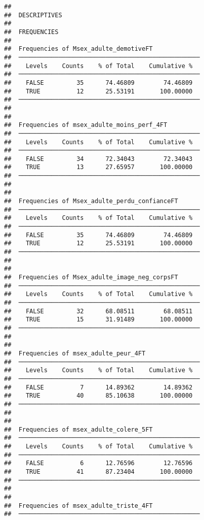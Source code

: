 \documentclass[
]{article}
\begin{document}
\begin{verbatim}
## 
##  DESCRIPTIVES
## 
##  FREQUENCIES
## 
##  Frequencies of Msex_adulte_demotiveFT              
##  ────────────────────────────────────────────────── 
##    Levels    Counts    % of Total    Cumulative %   
##  ────────────────────────────────────────────────── 
##    FALSE         35      74.46809        74.46809   
##    TRUE          12      25.53191       100.00000   
##  ────────────────────────────────────────────────── 
## 
## 
##  Frequencies of msex_adulte_moins_perf_4FT          
##  ────────────────────────────────────────────────── 
##    Levels    Counts    % of Total    Cumulative %   
##  ────────────────────────────────────────────────── 
##    FALSE         34      72.34043        72.34043   
##    TRUE          13      27.65957       100.00000   
##  ────────────────────────────────────────────────── 
## 
## 
##  Frequencies of Msex_adulte_perdu_confianceFT       
##  ────────────────────────────────────────────────── 
##    Levels    Counts    % of Total    Cumulative %   
##  ────────────────────────────────────────────────── 
##    FALSE         35      74.46809        74.46809   
##    TRUE          12      25.53191       100.00000   
##  ────────────────────────────────────────────────── 
## 
## 
##  Frequencies of Msex_adulte_image_neg_corpsFT       
##  ────────────────────────────────────────────────── 
##    Levels    Counts    % of Total    Cumulative %   
##  ────────────────────────────────────────────────── 
##    FALSE         32      68.08511        68.08511   
##    TRUE          15      31.91489       100.00000   
##  ────────────────────────────────────────────────── 
## 
## 
##  Frequencies of msex_adulte_peur_4FT                
##  ────────────────────────────────────────────────── 
##    Levels    Counts    % of Total    Cumulative %   
##  ────────────────────────────────────────────────── 
##    FALSE          7      14.89362        14.89362   
##    TRUE          40      85.10638       100.00000   
##  ────────────────────────────────────────────────── 
## 
## 
##  Frequencies of msex_adulte_colere_5FT              
##  ────────────────────────────────────────────────── 
##    Levels    Counts    % of Total    Cumulative %   
##  ────────────────────────────────────────────────── 
##    FALSE          6      12.76596        12.76596   
##    TRUE          41      87.23404       100.00000   
##  ────────────────────────────────────────────────── 
## 
## 
##  Frequencies of msex_adulte_triste_4FT              
##  ────────────────────────────────────────────────── 

\end{verbatim}
\end{document}
